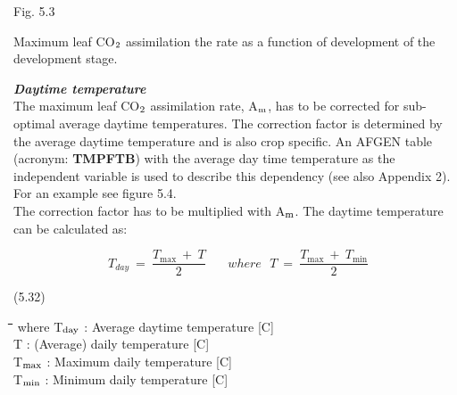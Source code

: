 \begin{figure}[htbp]
\begin{forcewidth}{8.44cm}
 \begin{center} \end{center}
\end{forcewidth}
\end{figure}














Fig. 5.3
\testlastline

\begin{indenting}{2.54cm}
Ma\-xi\-mum leaf CO$_{{\rm 2}}$ assimilation the rate as a function of develop\-ment of
the develop\-ment stage.
\end{indenting}

 
 {\bf {\it Daytime temperature\/}}\\
The maximum leaf CO$_{{\rm 2}}$ assimilation rate, A$_{{\rm m}}$, has to be corrected for sub-optimal average
daytime tempera\-tures. The correction factor is determined by the average daytime
temperature and is also crop specific. An AFGEN table (acronym: {\bf TMPFTB}) with the
average day time temperature as the independent variable is used to describe this
dependency (see also Appendix 2). For an example see figure 5.4. \\
The correction factor has to be multiplied with A$_{{\rm m}}$. The daytime temperature can be
calculated as:

\begin{displaymath}
T _{day} ~=~{\frac{T _{\max } ~ +~  T }{2}} ~~~~~~~~ where ~~~ T~=~{\frac{T _{\max } ~+~ T _{\min } }{2}}
\end{displaymath}

 
\strut\hfill (5.32)

\nwln
\begin{tabbing}
\hspace{1.27cm}\=\hspace{1.27cm}\=\hspace{1.27cm}\=\hspace{1.27cm}\=%
\hspace{1.27cm}\=\hspace{1.27cm}\=\hspace{1.27cm}\=\hspace{1.27cm}\=%
\hspace{1.27cm}\=\hspace{1.27cm}\=\kill
where T$_{{\rm day}}$ : Average daytime temperature        [\degrees C]\\
T : (Average) daily temperature        [\degrees C]\\
T$_{{\rm max}}$ : Maximum daily temperature        [\degrees C]\\
T$_{{\rm min}}$  : Minimum daily temperature        [\degrees C]
\end{tabbing}


